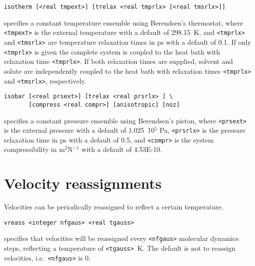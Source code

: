 \begin{description}

\item
\begin{verbatim}
isotherm [<real tmpext>] [trelax <real tmprlx> [<real tmsrlx>]]
\end{verbatim}
specifies a constant temperature ensemble using Berendsen's thermostat,
where \verb+<tmpext>+ is the external temperature with a default of 298.15~K,
and \verb+<tmprlx>+ and \verb+<tmsrlx>+ are temperature relaxation times in ps 
with a default of 0.1. If only \verb+<tmprlx>+ is given the complete system
is coupled to the heat bath with relaxation time \verb+<tmprlx>+. If both
relaxation times are supplied, solvent and solute are independently coupled
to the heat bath with relaxation times \verb+<tmprlx>+ and \verb+<tmsrlx>+,
respectively.

\item
\begin{verbatim}
isobar [<real prsext>] [trelax <real prsrlx> ] \
       [compress <real compr>] [anisotropic] [noz]
\end{verbatim}
specifies a constant pressure ensemble using Berendsen's piston,
where \verb+<prsext>+ is the external pressure with a default of 1.025~10$^5$ Pa,
\verb+<prsrlx>+ is the pressure relaxation time in ps with a default of 0.5, and
\verb+<compr>+ is the system compressibility in m$^2$N$^{-1}$ with a
default of 4.53E-10.
\end{description}

\section{Velocity reassignments}
Velocities can be periodically reassigned to reflect a certain temperature.
\begin{description}
\item
\begin{verbatim}
vreass <integer nfgaus> <real tgauss>
\end{verbatim}
specifies that velocities will be reassigned every \verb+<nfgaus>+ molecular
dynamics steps, reflecting a temperature of \verb+<tgauss>+~K. The default
is not to reassign velocities, i.e.\ \verb+<nfgaus>+ is 0.
\end{description}

